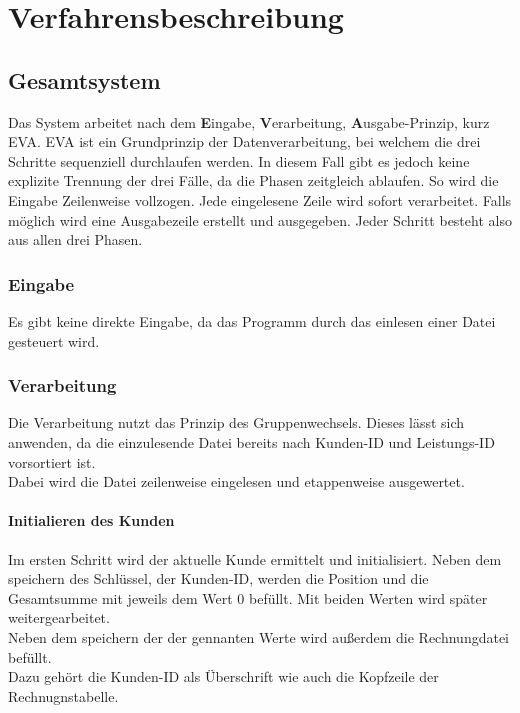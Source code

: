 \chapter{Verfahrensbeschreibung}\label{ch:verfahrensbeschreibung}


\section{Gesamtsystem}\label{sec:gesamtsystem}
Das System arbeitet nach dem \textbf{E}ingabe, \textbf{V}erarbeitung, \textbf{A}usgabe-Prinzip, kurz EVA.
EVA ist ein Grundprinzip der Datenverarbeitung, bei welchem die drei Schritte sequenziell durchlaufen werden.
In diesem Fall gibt es jedoch keine explizite Trennung der drei Fälle, da die Phasen zeitgleich ablaufen. So wird die Eingabe Zeilenweise vollzogen. Jede eingelesene Zeile wird sofort verarbeitet. Falls möglich wird eine Ausgabezeile erstellt und ausgegeben. Jeder Schritt besteht also aus allen drei Phasen.\\

\subsection{Eingabe}\label{subsec:eingabe}
Es gibt keine direkte Eingabe, da das Programm durch das einlesen einer Datei gesteuert wird.

\subsection{Verarbeitung}\label{subsec:verarbeitung}
Die Verarbeitung nutzt das Prinzip des Gruppenwechsels. Dieses lässt sich anwenden, da die einzulesende Datei bereits nach Kunden-ID und Leistungs-ID vorsortiert ist.\\
Dabei wird die Datei zeilenweise eingelesen und etappenweise ausgewertet.
\subsubsection{Initialieren des Kunden}
Im ersten Schritt wird der aktuelle Kunde ermittelt und initialisiert. Neben dem speichern des Schlüssel, der Kunden-ID, werden die Position und die Gesamtsumme mit jeweils dem Wert 0 befüllt. Mit beiden Werten wird später weitergearbeitet.\\
Neben dem speichern der der gennanten Werte wird außerdem die Rechnungdatei befüllt.\\
Dazu gehört die Kunden-ID als Überschrift wie auch die Kopfzeile der Rechnugnstabelle.\\


